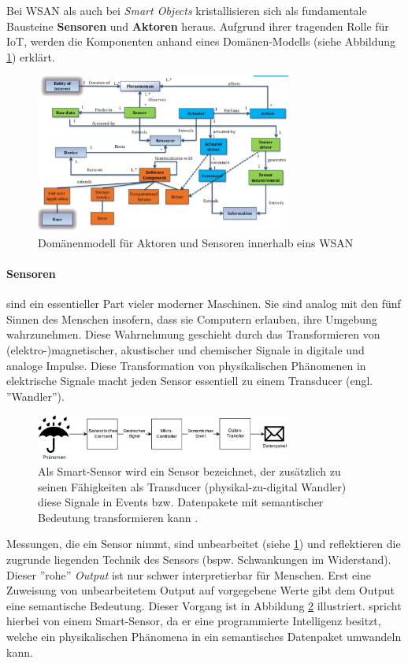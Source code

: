 Bei \ac{WSAN} als auch bei \textit{Smart Objects} kristallisieren sich als fundamentale Bausteine \textbf{Sensoren} und \textbf{Aktoren} heraus. Aufgrund ihrer tragenden Rolle für \ac{IoT}, werden die Komponenten anhand eines Domänen-Modells (siehe Abbildung \ref{fig:ActuatorSensorDomainmodel}) erklärt.
\begin{figure}[h]
    \centering
    \includegraphics[width=0.75\textwidth]{bilder/chapter2/domainmodel.png}
    \caption{Domänenmodell für Aktoren und Sensoren innerhalb eins \ac{WSAN}}
    \label{fig:ActuatorSensorDomainmodel}
\end{figure}

\paragraph{Sensoren} sind ein essentieller Part vieler moderner Maschinen. Sie sind analog mit den fünf Sinnen des Menschen insofern, dass sie Computern erlauben, ihre Umgebung wahrzunehmen. Diese Wahrnehmung geschieht durch das Transformieren von (elektro-)magnetischer, akustischer und chemischer Signale in digitale und analoge Impulse. Diese Transformation von physikalischen Phänomenen in elektrische Signale macht jeden Sensor essentiell zu einem Transducer (engl. ''Wandler''). 
\begin{figure}[h]
    \centering
    \includegraphics[width=0.75\textwidth]{bilder/chapter2/smartsensor.png}
    \caption{Als Smart-Sensor wird ein Sensor bezeichnet, der zusätzlich zu seinen Fähigkeiten als Transducer (physikal-zu-digital Wandler) diese Signale in Events bzw. Datenpakete mit semantischer Bedeutung transformieren kann \cite{rayes2017internet}.}
    \label{fig:Smartsensor}
\end{figure}
Messungen, die ein Sensor nimmt, sind unbearbeitet (siehe \ref{fig:ActuatorSensorDomainmodel}) und reflektieren die zugrunde liegenden Technik des Sensors (bspw. Schwankungen im Widerstand). Dieser ''rohe'' \textit{Output} ist nur schwer interpretierbar für Menschen. Erst eine Zuweisung von unbearbeitetem Output auf vorgegebene Werte gibt dem Output eine semantische Bedeutung. Dieser Vorgang ist in Abbildung \ref{fig:Smartsensor} illustriert. \cite{rayes2017internet} spricht hierbei von einem Smart-Sensor, da er eine programmierte Intelligenz besitzt, welche ein physikalischen Phänomena in ein semantisches Datenpaket umwandeln kann.

